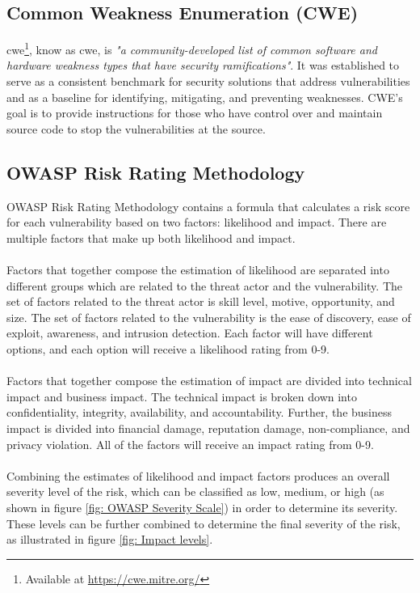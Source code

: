 \subsection{Common Weakness Enumeration (CWE)}
\label{cwe}
\acrlong{cwe}\footnote{Available at \url{https://cwe.mitre.org/}}, know as \acrshort{cwe}, is \textit{"a community-developed list of common software and hardware weakness types that have security ramifications"}\cite{CWE}. It was established to serve as a consistent benchmark for security solutions that address vulnerabilities and as a baseline for identifying, mitigating, and preventing weaknesses. CWE's goal is to provide instructions for those who have control over and maintain source code to stop the vulnerabilities at the source. 

\subsection{OWASP Risk Rating Methodology}
OWASP Risk Rating Methodology contains a formula that calculates a risk score for each vulnerability based on two factors: likelihood and impact. There are multiple factors that make up both likelihood and impact. 
\\~\\
Factors that together compose the estimation of likelihood are separated into different groups which are related to the threat actor and the vulnerability. The set of factors related to the threat actor is skill level, motive, opportunity, and size. The set of factors related to the vulnerability is the ease of discovery, ease of exploit, awareness, and intrusion detection. Each factor will have different options, and each option will receive a likelihood rating from 0-9. 
\\~\\
Factors that together compose the estimation of impact are divided into technical impact and business impact. The technical impact is broken down into confidentiality, integrity, availability, and accountability. Further, the business impact is divided into financial damage, reputation damage, non-compliance, and privacy violation. All of the factors will receive an impact rating from 0-9. 
\\~\\
Combining the estimates of likelihood and impact factors produces an overall severity level of the risk, which can be classified as low, medium, or high (as shown in figure \ref{fig: OWASP Severity Scale}) in order to determine its severity. These levels can be further combined to determine the final severity of the risk, as illustrated in figure \ref{fig: Impact levels}.
\cite{owasprisk}

